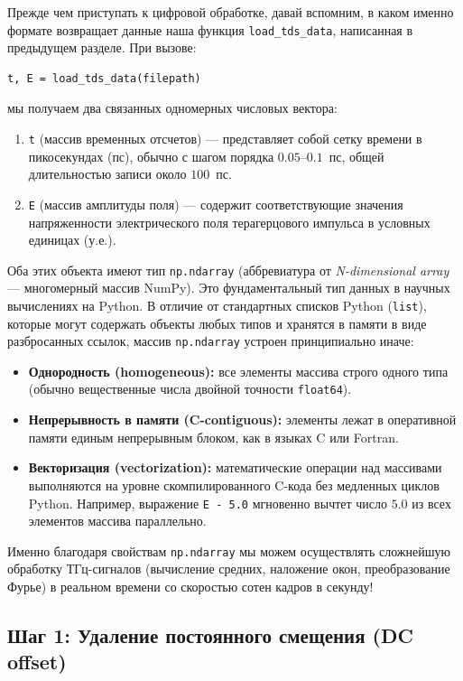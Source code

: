 Прежде чем приступать к цифровой обработке, давай вспомним, в каком именно формате возвращает данные наша функция \texttt{load\_tds\_data}, написанная в предыдущем разделе. При вызове:
\begin{verbatim}
t, E = load_tds_data(filepath)
\end{verbatim}
мы получаем два связанных одномерных числовых вектора:
\begin{enumerate}
    \item \texttt{t} (массив временных отсчетов) — представляет собой сетку времени в пикосекундах ($\text{пс}$), обычно с шагом порядка $0.05$--$0.1$~пс, общей длительностью записи около $100$~пс.
    \item \texttt{E} (массив амплитуды поля) — содержит соответствующие значения напряженности электрического поля терагерцового импульса в условных единицах (у.е.).
\end{enumerate}

Оба этих объекта имеют тип \texttt{np.ndarray} (аббревиатура от \textit{N-dimensional array} — многомерный массив NumPy). Это фундаментальный тип данных в научных вычислениях на Python. В отличие от стандартных списков Python (\texttt{list}), которые могут содержать объекты любых типов и хранятся в памяти в виде разбросанных ссылок, массив \texttt{np.ndarray} устроен принципиально иначе:
\begin{itemize}
    \item \textbf{Однородность (homogeneous):} все элементы массива строго одного типа (обычно вещественные числа двойной точности \texttt{float64}).
    \item \textbf{Непрерывность в памяти (C-contiguous):} элементы лежат в оперативной памяти единым непрерывным блоком, как в языках C или Fortran.
    \item \textbf{Векторизация (vectorization):} математические операции над массивами выполняются на уровне скомпилированного C-кода без медленных циклов Python. Например, выражение \texttt{E - 5.0} мгновенно вычтет число $5.0$ из всех элементов массива параллельно.
\end{itemize}

Именно благодаря свойствам \texttt{np.ndarray} мы можем осуществлять сложнейшую обработку ТГц-сигналов (вычисление средних, наложение окон, преобразование Фурье) в реальном времени со скоростью сотен кадров в секунду!

\subsection{Шаг 1: Удаление постоянного смещения (DC offset)}

